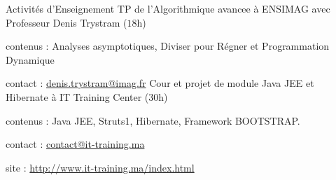 
\begin{rubric}{Activités d’Enseignement}
\entry*[$2015$ -- $2016$]%
	TP de l'Algorithmique avancee à ENSIMAG avec Professeur Denis Trystram ($18$h)
	\par contenus : Analyses asymptotiques, Diviser pour Régner et Programmation Dynamique
	\par contact :  \href{mailto:denis.trystram@imag.fr}{denis.trystram@imag.fr}
%
\entry*[$2014$ -- $2015$]
        Cour et projet de module Java JEE et Hibernate à IT Training Center ($30$h)
	\par contenus : Java JEE, Struts1, Hibernate, Framework BOOTSTRAP.
	\par contact :  \href{mailto:contact@it-training.ma}{contact@it-training.ma}
	\par site : \url{http://www.it-training.ma/index.html}
%
\end{rubric}
